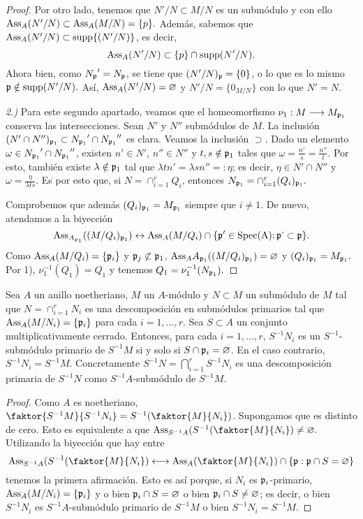 \documentclass[../main.tex]{subfiles}
\begin{document}
\begin{theorem}
\begin{proof}
	Por otro lado, tenemos que $N'/N\subset M/N$ es un submódulo y con ello $\text{Ass}_A(N'/N)\subset\text{Ass}_A(M/N)=\{p\}.$ Además, sabemos que $\text{Ass}_A(N'/N)\subset\operatorname{supp}\{(N'/N)\}$, es decir,
	$$\text{Ass}_A(N'/N)\subset\{p\}\cap\operatorname{supp}(N'/N).$$
	Ahora bien, como ${N_{\mathfrak{p}}}'=N_{\mathfrak{p}}$, se tiene que $(N'/N)_{\mathfrak{p}}=\{0\}$, o lo que es lo mismo $\mathfrak{p}\notin\operatorname{supp}(N'/N).$ Así, $\text{Ass}_A(N'/N)=\varnothing$ y $N'/N=\{0_{M/N}\}$ con lo que $N'=N.$
	
	\textit{2.)} Para este segundo apartado, veamos que el homeomorfismo $\nu_1:M\longrightarrow M_{\mathfrak{p}_1}$ conserva las intersecciones. Sean $N'$ y $N''$ submódulos de $M$. La inclusión $(N'\cap N'')_{\mathfrak{p}_1}\subset {N_{\mathfrak{p}_1}}'\cap{N_{\mathfrak{p}_1}}''$ es clara. Veamos la inclusión $\supset.$ Dado un elemento $\omega\in {N_{\mathfrak{p}_1}}'\cap{N_{\mathfrak{p}_1}}''$, existen $n'\in N'$, $n''\in N''$ y $t,s\notin\mathfrak{p}_1$ tales que $\omega=\frac{n'}{s}=\frac{n''}{t}.$ Por esto, también existe $\lambda\notin\mathfrak{p}_1$ tal que $\lambda tn'=\lambda sn''=:\eta$; es decir, $\eta\in N'\cap N''$ y $\omega=\frac{\eta}{\lambda ts}.$ Es por esto que, si $N=\cap_{i=1}^r Q_i$, entonces $N_{\mathfrak{p}_1}=\cap_{i=1}^r(Q_i)_{\mathfrak{p}_1}.$ 
	
	Comprobemos que además $(Q_i)_{\mathfrak{p}_1}=M_{\mathfrak{p}_1}$ siempre que $i\neq 1.$ De nuevo, atendamos a la biyección
	$$\text{Ass}_{A_{\mathfrak{p}_1}}((M/Q_i)_{\mathfrak{p}_1})\leftrightarrow\text{Ass}_A(M/Q_i)\cap\{\mathfrak{p}'\in\operatorname{Spec(A):\mathfrak{p}'\subset\mathfrak{p}}\}.$$
	Como $\text{Ass}_A(M/Q_i)=\{\mathfrak{p}_i\}$ y $\mathfrak{p}_j\not\subset\mathfrak{p}_1$, $\text{Ass}_A{A_{\mathfrak{p}_1}}((M/Q_i)_{\mathfrak{p}_1})=\varnothing$ y $(Q_i)_{\mathfrak{p}_1}=M_{\mathfrak{p}_1}.$ Por 1), $\nu_1^{-1}(Q_1)=Q_1$ y tenemos $Q_1=\nu_1^{-1}(N_{\mathfrak{p}_1}).$
\end{proof}


\begin{proposition}
	Sea $A$ un anillo noetheriano, $M$ un $A$-módulo y $N\subset M$ un submódulo de $M$ tal que $N=\cap_{i=1}^rN_i$ es una descomposición en submódulos primarios tal que $\text{Ass}_A(M/N_i)=\{\mathfrak{p}_i\}$ para cada $i=1,\dots,r$. Sea $S\subset A$ un conjunto multiplicativamente cerrado. Entonces, para cada $i=1,\dots,r$, $S^{-1}N_i$ es un $S^{-1}$-submódulo primario de $S^{-1}M$ si y solo si $S\cap\mathfrak{p}_i=\varnothing$. En el caso contrario, $S^{-1}N_i=S^{-1}M$. Concretamente $S^{-1}N=\bigcap_{i=1}^rS^{-1}N_i$ es una descomposición primaria de $S^{-1}N$ como $S^{-1}A$-submódulo de $S^{-1}M.$
\end{proposition}
\begin{proof}
	Como $A$ es noetheriano, $\faktor{S^{-1}M}{S^{-1}N_i}=S^{-1}(\faktor{M}{N_i})$. Supongamos que es distinto de cero. Esto es equivalente a que $\Ass_{S^{-1}A}(S^{-1}(\faktor{M}{N_i})\neq\varnothing.$ Utilizando la biyección que hay entre$$\Ass_{S^{-1}A}(S^{-1}(\faktor{M}{N_i})\longleftrightarrow\Ass_A(\faktor{M}{N_i})\cap\{\p:\p\cap S=\varnothing\}$$tenemos la primera afirmación. Esto es así porque, si $N_i$ es $\mathfrak{p}_i$-primario, $\text{Ass}_A(M/N_i)=\{\mathfrak{p}_i\}$ y o bien $\mathfrak{p}_i\cap S=\varnothing$ o bien $\mathfrak{p}_i\cap S\neq\varnothing$; es decir, o bien $S^{-1}N_i$ es $S^{-1}A$-submódulo primario de $S^{-1}M$ o bien $S^{-1}N_i=S^{-1}M.$
	

\end{proof}
\end{theorem}
\end{document}
